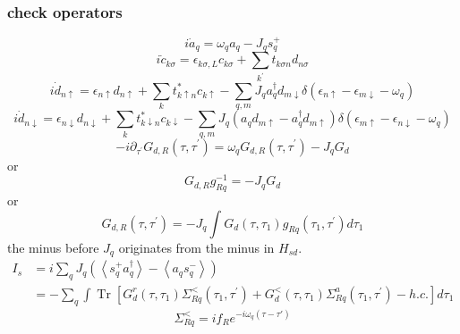 \documentclass[11pt,a4paper]{book}
\begin{document}
\subsubsection{check operators}
\begin{equation}
i \dot{a}_{q}=\omega_{q} a_{q}-J_{q} s_{q}^{+}
\end{equation}
\begin{equation}
i \dot{c}_{k \sigma}=\epsilon_{k \sigma, L} c_{k \sigma}+\sum_{k^{\prime}} t_{k \sigma n} d_{n \sigma}
\end{equation}
\begin{equation}
i \dot{d}_{n \uparrow}=\epsilon_{n \uparrow} d_{n \uparrow}+\sum_{k} t_{k \uparrow n}^{*} c_{k \uparrow}-\sum_{q, m} J_{q} a_{q}^{\dagger}d_{m \downarrow}\delta(\epsilon_{n \uparrow}-\epsilon_{m \downarrow}-\omega_{q})
\end{equation}
\begin{equation}
i \dot{d}_{n \downarrow}=\epsilon_{n \downarrow} d_{n \downarrow}+\sum_{k} t_{k \downarrow n}^{*} c_{k \downarrow}-\sum_{q, m} J_{q} (a_{q}d_{m \uparrow}  - a_{q}^{\dag}d_{m\uparrow})\delta(\epsilon_{m \uparrow}-\epsilon_{n \downarrow}-\omega_{q})
\end{equation}
\begin{equation}
-i \partial_{\tau^{\prime}} G_{d, R}\left(\tau, \tau^{\prime}\right)=\omega_{q} G_{d, R}\left(\tau, \tau^{\prime}\right)-J_{q} G_{d}
\end{equation}
or
\begin{equation}
G_{d, R} g_{R q}^{-1}=-J_{q} G_{d}
\end{equation}
or
\begin{equation}
G_{d, R}\left(\tau, \tau^{\prime}\right)=-J_{q} \int G_{d}\left(\tau, \tau_{1}\right) g_{R q}\left(\tau_{1}, \tau^{\prime}\right) d \tau_{1}
\end{equation}
the minus before $J_{q}$ originates from the minus in $H_{sd}$.
\begin{equation}
\begin{split}
I_{s}&= i \sum_{q} J_{q}\left(\left\langle s_{q}^{+} a_{q}^{\dagger}\right\rangle-\left\langle a_{q} s_{q}^{-}\right\rangle\right) \\
&=-\sum_{q} \int \operatorname{Tr}\left[G_{d}^{r}\left(\tau, \tau_{1}\right) \Sigma_{R q}^{<}\left(\tau_{1}, \tau^{\prime}\right)+G_{d}^{<}\left(\tau, \tau_{1}\right) \Sigma_{R q}^{a}\left(\tau_{1}, \tau^{\prime}\right)-h . c .\right] d \tau_{1}
\end{split}
\end{equation}
\begin{equation}
\Sigma_{R q}^{<}=i f_{R} e^{-i\omega_{q}(\tau-\tau')}
\end{equation}
\end{document}
